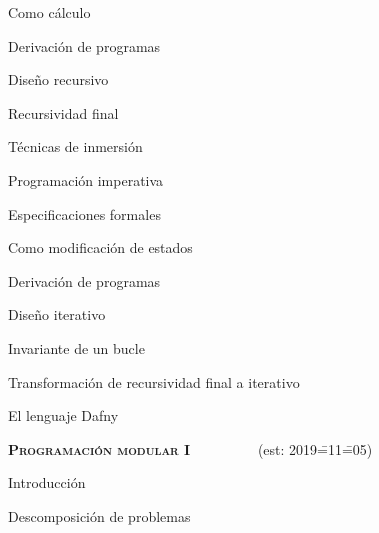 \begin{longenum}
\begin{longenum}
\begin{longenum}
            \begin{longenum}
                \item Como cálculo
            \end{longenum}
            \item Derivación de programas
            \begin{longenum}
                \item Diseño recursivo
                \begin{longenum}
                    \item Recursividad final
                    \item Técnicas de inmersión \opcional\
                \end{longenum}
            \end{longenum}
        \end{longenum}
        \item Programación imperativa
        \begin{longenum}
            \item Especificaciones formales
            \begin{longenum}
                \item Como modificación de estados
            \end{longenum}
            \item Derivación de programas
            \begin{longenum}
                \item Diseño iterativo
                \begin{longenum}
                    \item Invariante de un bucle
                    \item Transformación de recursividad final a iterativo
                \end{longenum}
            \end{longenum}
        \end{longenum}
        \item El lenguaje Dafny \opcional\
    \end{longenum}
    \item \textbf{\textsc{Programación modular I}} \ \ \ \ \ \ \ \ \ (est: 2019\==11\==05)
    \begin{longenum}
        \item Introducción
        \begin{longenum}
            \item Descomposición de problemas

\end{longenum}
\end{longenum}
\end{longenum}
